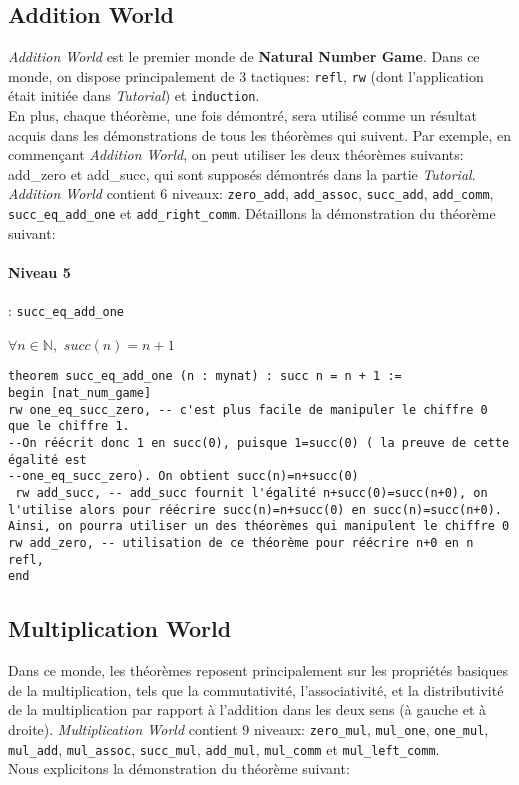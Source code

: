 \subsection{Addition World}
\textit{Addition World} est le premier monde de \textbf{Natural Number Game}. Dans ce monde, on dispose principalement de 3 tactiques: \texttt{refl}, \texttt{rw} (dont l'application était initiée dans \textit{Tutorial}) et \texttt{induction}.\\
En plus, chaque théorème, une fois démontré, sera utilisé comme un résultat acquis dans les démonstrations de tous les théorèmes qui suivent. Par exemple, en commençant \textit{Addition World}, on peut utiliser les deux théorèmes suivants: add\_zero et add\_succ, qui sont supposés démontrés dans la partie \textit{Tutorial}.
\textit{Addition World} contient 6 niveaux: \texttt{zero\_add}, \texttt{add\_assoc}, \texttt{succ\_add}, \texttt{add\_comm}, \texttt{succ\_eq\_add\_one} et \texttt{add\_right\_comm}.
Détaillons la démonstration du théorème suivant:\\
\paragraph{Niveau 5} : \texttt{succ\_eq\_add\_one} \begin{center}   $\forall n \in \mathbb{N},$  $succ(n)=n+1$ \end{center}

\begin{verbatim}
theorem succ_eq_add_one (n : mynat) : succ n = n + 1 :=
begin [nat_num_game]
rw one_eq_succ_zero, -- c'est plus facile de manipuler le chiffre 0 que le chiffre 1. 
--On réécrit donc 1 en succ(0), puisque 1=succ(0) ( la preuve de cette égalité est
--one_eq_succ_zero). On obtient succ(n)=n+succ(0)
 rw add_succ, -- add_succ fournit l'égalité n+succ(0)=succ(n+0), on l'utilise alors pour réécrire succ(n)=n+succ(0) en succ(n)=succ(n+0). Ainsi, on pourra utiliser un des théorèmes qui manipulent le chiffre 0
rw add_zero, -- utilisation de ce théorème pour réécrire n+0 en n
refl,
end
\end{verbatim}
\subsection{Multiplication World}
Dans ce monde, les théorèmes reposent principalement sur les propriétés basiques de la multiplication, tels que la commutativité, l'associativité, et la distributivité de la multiplication par rapport à l'addition dans les deux sens (à gauche et à droite). \textit{Multiplication World} contient 9 niveaux: \texttt{zero\_mul}, \texttt{mul\_one}, \texttt{one\_mul}, \texttt{mul\_add}, \texttt{mul\_assoc}, \texttt{succ\_mul}, \texttt{add\_mul}, \texttt{mul\_comm} et \texttt{mul\_left\_comm}.\\ Nous explicitons la démonstration du théorème suivant: \\
